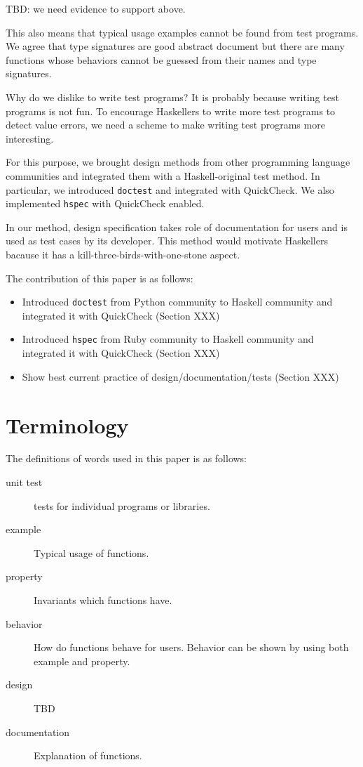 \documentclass[preprint]{sigplanconf}
\begin{document}
TBD: we need evidence to support above.

This also means that typical usage examples cannot be found from test programs.
We agree that type signatures are good abstract document but
there are many functions whose behaviors cannot be guessed from
their names and type signatures.

Why do we dislike to write test programs?
It is probably because writing test programs is not fun.
To encourage Haskellers to write more test programs
to detect value errors,
we need a scheme to make writing test programs more interesting.

For this purpose,
we brought design methods from other programming language communities and
integrated them with a Haskell-original test method.
In particular, we introduced {\tt doctest} and
integrated with QuickCheck. 
We also implemented {\tt hspec} with QuickCheck enabled.

In our method, design specification takes role of documentation for users and
is used as test cases by its developer. 
This method would motivate Haskellers
bacause it has a kill-three-birds-with-one-stone aspect.



The contribution of this paper is as follows:

\begin{itemize}
\item Introduced {\tt doctest} from Python community to Haskell community
and integrated it with QuickCheck (Section XXX)
\item Introduced {\tt hspec} from Ruby community to Haskell community and
integrated it with QuickCheck (Section XXX)
\item Show best current practice of design/documentation/tests (Section XXX)
\end{itemize}

\section{Terminology}

The definitions of words used in this paper is as follows:

\begin{description}
\item[unit test] tests for individual programs or libraries.
\item[example] Typical usage of functions.
\item[property] Invariants which functions have.
\item[behavior] How do functions behave for users. Behavior can be shown by using both example and property.
\item[design] TBD
\item[documentation] Explanation of functions.
\end{description}
\end{document}
